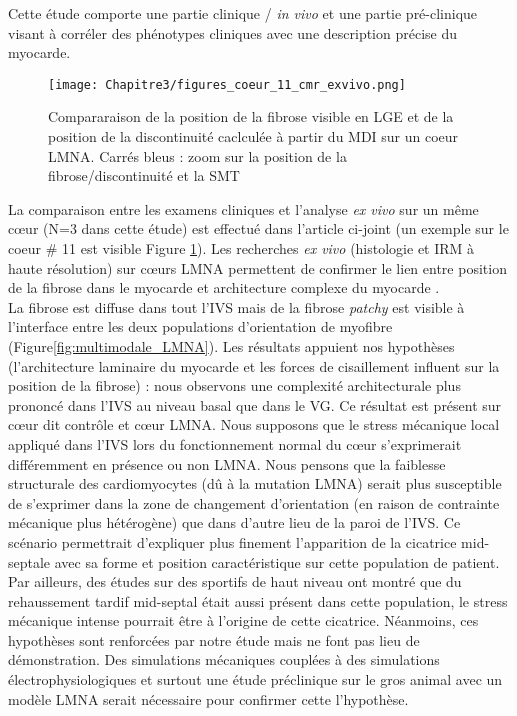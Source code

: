 Cette étude comporte une partie clinique / \textit{in vivo} et une partie pré-clinique visant à corréler des phénotypes cliniques avec une description précise du myocarde.

\begin{figure}[!ht]
  \begin{center}
    \texttt{[image: Chapitre3/figures\_coeur\_11\_cmr\_exvivo.png]}
  \end{center}
  \caption{Compararaison de la position de la fibrose visible en LGE et de la position de la discontinuité caclculée à partir du MDI sur un coeur LMNA. Carrés bleus : zoom sur la position de la fibrose/discontinuité et la SMT}
  \label{fig:CMR_LMNA}
\end{figure}
La comparaison entre les examens cliniques et l’analyse \textit{ex vivo} sur un même cœur (N=3 dans cette étude) est effectué dans l’article ci-joint (un exemple sur le coeur \# 11 est visible Figure \ref{fig:CMR_LMNA}). Les recherches \textit{ex vivo} (histologie et IRM à haute résolution) sur cœurs LMNA permettent de confirmer le lien entre position de la fibrose dans le myocarde et architecture complexe du myocarde \cite{Chatzifrangkeskou2023}. 
\\
La fibrose est diffuse dans tout l’IVS mais de la fibrose \textit{patchy} est visible à l’interface entre les deux populations d’orientation de myofibre (Figure\ref{fig:multimodale_LMNA}). Les résultats appuient nos hypothèses (l'architecture laminaire du myocarde et  les forces de cisaillement influent sur la position de la fibrose) : nous observons une complexité architecturale plus prononcé dans l’IVS au niveau basal que dans le VG. Ce résultat est présent sur cœur dit contrôle et cœur LMNA. Nous supposons que le stress mécanique local appliqué dans l’IVS lors du fonctionnement normal du cœur s’exprimerait différemment en présence ou non LMNA.  Nous pensons que la faiblesse structurale des cardiomyocytes (dû à la mutation LMNA) serait plus susceptible de s’exprimer dans la zone de changement d’orientation (en raison de contrainte mécanique plus hétérogène) que dans d’autre lieu de la paroi de l’IVS. Ce scénario permettrait d’expliquer plus finement l’apparition de la cicatrice mid-septale avec sa forme et position caractéristique sur cette population de patient. 
\\
Par ailleurs, des études sur des sportifs de haut niveau \cite{Szabo2022} ont montré que du rehaussement tardif mid-septal était aussi présent dans cette population, le stress mécanique intense pourrait être à l’origine de cette cicatrice. Néanmoins, ces hypothèses sont renforcées par notre étude mais ne font pas lieu de démonstration. Des simulations mécaniques couplées à des simulations électrophysiologiques et surtout une étude préclinique sur le gros animal avec un modèle LMNA serait nécessaire pour confirmer cette l’hypothèse. 
